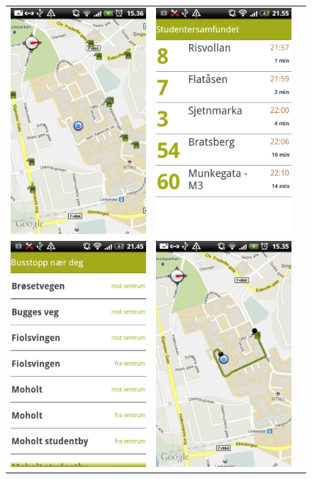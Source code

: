 \begin{figure}
\begin{tabular}{ccc}
\includegraphics[width=0.27\linewidth]{Results/maprealtime.png} &
\includegraphics[width=0.27\linewidth]{Results/realtime.png} \\
\includegraphics[width=0.27\linewidth]{Results/realtimelist.png} & 
\includegraphics[width=0.27\linewidth]{Results/otherbusstop.png} &

\end{tabular}
\end{figure}

